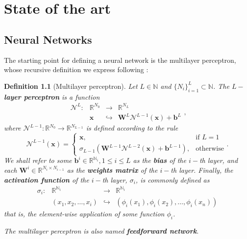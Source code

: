 \documentclass[12pt]{report} %
\newtheorem{definition}{Definition}
\newcommand{\tmmathbf}[1]{\ensuremath{\boldsymbol{#1}}}
\begin{document}
\chapter{State of the art} \label{chap:state-of-the-art}
\section{Neural Networks} \label{sec-neural-networks}
The starting point for defining a neural network is the multilayer perceptron, whose recursive definition we express following \cite{lu2021deepxde}:
\begin{definition}[Multilayer perceptron]
  Let \(L \in \mathbb{N}\) and \(\{ N_i \}_{i = 1}^L \subset \mathbb{N}\). The
    {\textbf{$L-$layer perceptron}} is a function
  \begin{equation}
    \begin{array}{llll}
      \mathcal{N}^L : & \mathbb{R}^{N_0} & \rightarrow     & \mathbb{R}^{N_L}                   \\
                      & \tmmathbf{x}     & \hookrightarrow & \tmmathbf{W}^L \mathcal{N}^{L - 1}
      (\tmmathbf{x}) +\tmmathbf{b}^L
    \end{array},
    \label{perceptronRule}
  \end{equation}
  where \(\mathcal{N}^{L - 1} : \mathbb{R}^{N_0} \rightarrow \mathbb{R}^{N_{L- 1}}\) is defined according to the rule
  \[ \mathcal{N}^{L - 1} (\tmmathbf{x}) = \left\{\begin{array}{ll}
      \tmmathbf{x},           & \text{if } L = 1 \\
      \sigma_{L - 1} (\tmmathbf{W}^{L - 1} \mathcal{N}^{L - 2} (\tmmathbf{x})
      +\tmmathbf{b}^{L - 1}), & \text{otherwise}
    \end{array}\right. . \]
  We shall refer to some \(\tmmathbf{b}^i \in \mathbb{R}^{\mathbb{N}_i}, 1 \leq i \leq L\) as the {\textbf{bias}} of the \(i -\)th layer, and each
  \(\tmmathbf{W}^i \in \mathbb{R}^{N_i \times N_{i - 1}}\) as the
  \textbf{weights matrix} of the \(i -\)th layer. Finally, the \textbf{activation function} of the $i
    -$th layer, \(\sigma_i\), is commonly defined as
  \[ \begin{array}{cccc}
      \sigma_i : & \mathbb{R}^{\mathbb{N}_i} & \rightarrow     &
      \mathbb{R}^{\mathbb{N}_i}                                                               \\
                 & (x_1, x_2, \ldots, x_i)   & \hookrightarrow & (\phi_i (x_1), \phi_i (x_2),
      \ldots, \phi_i (x_n))
    \end{array} \]
  that is, the element-wise application of some function
  $\phi_i$.

  The multilayer perceptron is also named \textbf{feedforward network}.
\end{definition}
\end{document}
